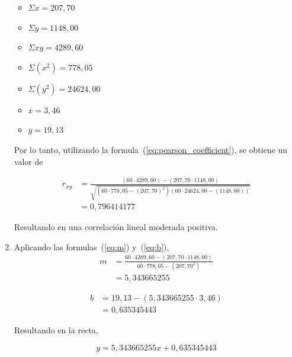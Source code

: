 \documentclass[conference]{IEEEtran}
\begin{document}
\begin{enumerate}
	      \begin{itemize}
		      \item $\Sigma x = 207,70$
		      \item $\Sigma y = 1148,00$
		      \item $\Sigma xy = 4289,60$
		      \item $\Sigma (x^{2}) = 778,05$
		      \item $\Sigma (y^{2}) = 24624,00$
		      \item $\overline{x} = 3,46$
		      \item $\overline{y} = 19,13$
	      \end{itemize}

	      Por lo tanto, utilizando la formula~(\ref{eq:pearson_coefficient}),
	      se obtiene un valor de

		      {\scriptsize
			      \begin{align*}
				      r_{xy} & = \frac{(60 \cdot 4289,60) - (207,70 \cdot 1148,00)}{\sqrt{(60 \cdot 778,05 - {(207,70)}^{2}) (60 \cdot 24624,00 - {(1148,00)})}} \\
				             & = 0,796414177
			      \end{align*}
		      }

	      Resultando en una correlación lineal moderada positiva.

	\item Aplicando las formulas~(\ref{eq:m}) y~(\ref{eq:b}),
	      \begin{align*}
		      m & = \frac{60 \cdot 4289,60 - (207,70 \cdot 1148,00)}{60 \cdot 778,05 - (207,70^{2})} \\
		        & = 5,343665255
	      \end{align*}

	      \begin{align*}
		      b & = 19,13 - (5,343665255 \cdot 3,46) \\
		        & = 0,635345443
	      \end{align*}

	      Resultando en la recta,

	      \begin{equation*}
		      y = 5,343665255 x + 0,635345443
	      \end{equation*}


\end{enumerate}
\end{document}
